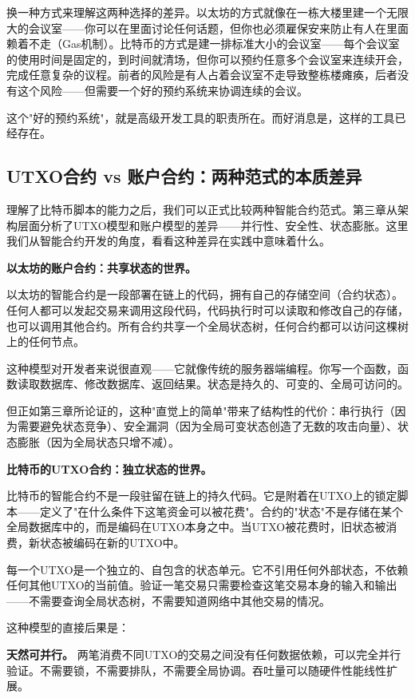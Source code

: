 \documentclass[a4paper,12pt,openany]{ctexbook}
\begin{document}
换一种方式来理解这两种选择的差异。以太坊的方式就像在一栋大楼里建一个无限大的会议室——你可以在里面讨论任何话题，但你也必须雇保安来防止有人在里面赖着不走（Gas机制）。比特币的方式是建一排标准大小的会议室——每个会议室的使用时间是固定的，到时间就清场，但你可以预约任意多个会议室来连续开会，完成任意复杂的议程。前者的风险是有人占着会议室不走导致整栋楼瘫痪，后者没有这个风险——但需要一个好的预约系统来协调连续的会议。

这个"好的预约系统"，就是高级开发工具的职责所在。而好消息是，这样的工具已经存在。


\subsection*{UTXO合约 vs 账户合约：两种范式的本质差异}


理解了比特币脚本的能力之后，我们可以正式比较两种智能合约范式。第三章从架构层面分析了UTXO模型和账户模型的差异——并行性、安全性、状态膨胀。这里我们从智能合约开发的角度，看看这种差异在实践中意味着什么。

\textbf{以太坊的账户合约：共享状态的世界。}

以太坊的智能合约是一段部署在链上的代码，拥有自己的存储空间（合约状态）。任何人都可以发起交易来调用这段代码，代码执行时可以读取和修改自己的存储，也可以调用其他合约。所有合约共享一个全局状态树，任何合约都可以访问这棵树上的任何节点。

这种模型对开发者来说很直观——它就像传统的服务器端编程。你写一个函数，函数读取数据库、修改数据库、返回结果。状态是持久的、可变的、全局可访问的。

但正如第三章所论证的，这种"直觉上的简单"带来了结构性的代价：串行执行（因为需要避免状态竞争）、安全漏洞（因为全局可变状态创造了无数的攻击向量）、状态膨胀（因为全局状态只增不减）。

\textbf{比特币的UTXO合约：独立状态的世界。}

比特币的智能合约不是一段驻留在链上的持久代码。它是附着在UTXO上的锁定脚本——定义了"在什么条件下这笔资金可以被花费"。合约的"状态"不是存储在某个全局数据库中的，而是编码在UTXO本身之中。当UTXO被花费时，旧状态被消费，新状态被编码在新的UTXO中。

每一个UTXO是一个独立的、自包含的状态单元。它不引用任何外部状态，不依赖任何其他UTXO的当前值。验证一笔交易只需要检查这笔交易本身的输入和输出——不需要查询全局状态树，不需要知道网络中其他交易的情况。

这种模型的直接后果是：

\textbf{天然可并行。} 两笔消费不同UTXO的交易之间没有任何数据依赖，可以完全并行验证。不需要锁，不需要排队，不需要全局协调。吞吐量可以随硬件性能线性扩展。
\end{document}
